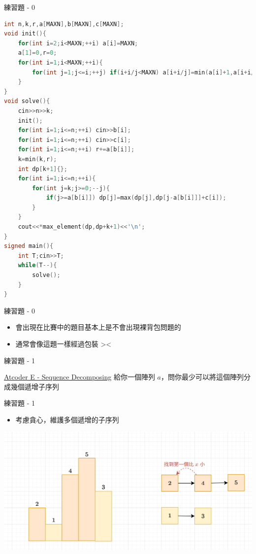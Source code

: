 \documentclass[aspectratio=169]{beamer}
\begin{document}
    \begin{frame}[fragile]{練習題 - 0}
        \begin{lstlisting}[language=C++,basicstyle=\ttfamily\tiny]
int n,k,r,a[MAXN],b[MAXN],c[MAXN];
void init(){
    for(int i=2;i<MAXN;++i) a[i]=MAXN;
    a[1]=0,r=0;
    for(int i=1;i<MAXN;++i){
        for(int j=1;j<=i;++j) if(i+i/j<MAXN) a[i+i/j]=min(a[i]+1,a[i+i/j]);
    }
}
void solve(){
    cin>>n>>k;
    init();
    for(int i=1;i<=n;++i) cin>>b[i];
    for(int i=1;i<=n;++i) cin>>c[i];   
    for(int i=1;i<=n;++i) r+=a[b[i]];
    k=min(k,r);
    int dp[k+1]{};
    for(int i=1;i<=n;++i){
        for(int j=k;j>=0;--j){
            if(j>=a[b[i]]) dp[j]=max(dp[j],dp[j-a[b[i]]]+c[i]);
        }
    }
    cout<<*max_element(dp,dp+k+1)<<'\n';
}
signed main(){
    int T;cin>>T;
    while(T--){
        solve();
    }
}       
        \end{lstlisting}
    \end{frame}

    \begin{frame}{練習題 - 0}
        \begin{itemize}
            \item 會出現在比賽中的題目基本上是不會出現裸背包問題的
            \item 通常會像這題一樣經過包裝 ><
        \end{itemize}
    \end{frame}

    \begin{frame}{練習題 - 1}
        \begin{block}{\href{https://atcoder.jp/contests/abc134/tasks/abc134_e}{Atcoder E - Sequence Decomposing}}
            給你一個陣列 $a$，問你最少可以將這個陣列分成幾個遞增子序列
        \end{block}
    \end{frame}

    \begin{frame}{練習題 - 1}
        \begin{itemize}
            \item 考慮貪心，維護多個遞增的子序列
        \end{itemize}
        \begin{center}
            \includegraphics[scale=0.25]{images/ABC134E_Greedy.png}
        \end{center}
    \end{frame}
    
\end{document}
